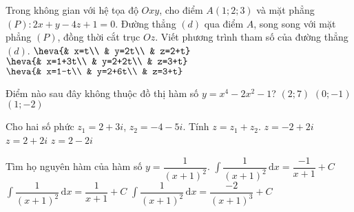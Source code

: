 \begin{ex}%
Trong không gian với hệ tọa độ $Oxy$, cho điểm $A(1;2;3)$ và mặt phẳng $(P)\colon 2x+y-4z+1=0$. Đường thẳng $(d)$ qua điểm $A$, song song với mặt phẳng $(P)$, đồng thời cắt trục $Oz$. Viết phương trình tham số của đường thẳng $(d)$.
{\True $\heva{& x=t\\ & y=2t\\ & z=2+t}$}
{$\heva{& x=1+3t\\ & y=2+2t\\ & z=3+t}$}
{$\heva{& x=1-t\\ & y=2+6t\\ & z=3+t}$}
\end{ex}

\begin{ex}%
Điểm nào sau đây không thuộc đồ thị hàm số $y=x^4-2x^2-1$?
{$(2;7)$}
{$(0;-1)$}
{$(1;-2)$}
\end{ex}

\begin{ex}%
Cho hai số phức $z_1=2+3i$, $z_2=-4-5i$. Tính $z=z_1+z_2$.
{$z=-2+2i$}
{$z=2+2i$}
{$z=2-2i$}
\end{ex}

\begin{ex}%
Tìm họ nguyên hàm của hàm số $y=\dfrac{1}{(x+1)^2}$.
{\True $\displaystyle\int\dfrac{1}{(x+1)^2}\mathrm{\, d}x=\dfrac{-1}{x+1}+C$}
{$\displaystyle\int\dfrac{1}{(x+1)^2}\mathrm{\, d}x=\dfrac{1}{x+1}+C$}
{$\displaystyle\int\dfrac{1}{(x+1)^2}\mathrm{\, d}x=\dfrac{-2}{(x+1)^3}+C$}
\end{ex}

